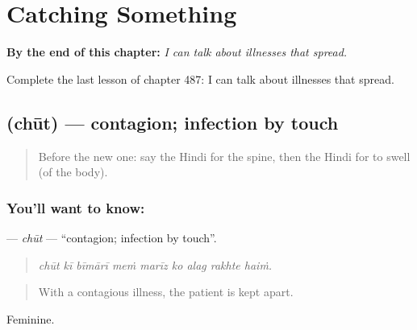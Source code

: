 
\chapter{Catching Something}
\label{ch:hi-catching-something}

\begin{chapteropening}
\textbf{By the end of this chapter:} \emph{I can talk about illnesses that spread.}

Complete the last lesson of chapter 487: I can talk about illnesses that spread.
\end{chapteropening}

\section[\texorpdfstring{\hi{छूत} (chūt)}{छूत (chūt)}]{ (chūt) — contagion; infection by touch}

\label{lesson:HI-C487-chut}



\begin{quote}
Before the new one: say the Hindi for the spine, then the Hindi for to swell (of the body).
\end{quote}

\subsection*{You'll want to know: }
\textbf{} — \emph{chūt} — \textquotedblleft{}contagion; infection by touch\textquotedblright{}.

\begin{quote}
        
\end{quote}

\begin{quote}
\emph{chūt kī bīmārī meṁ marīz ko alag rakhte haiṁ.}
\end{quote}

\begin{quote}
With a contagious illness, the patient is kept apart.
\end{quote}

Feminine.

